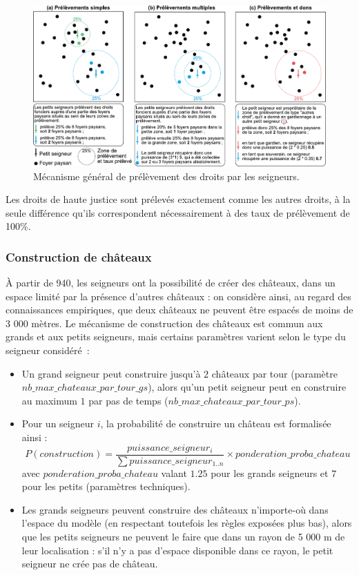 \begin{figure}[H]
	\centering
	\includegraphics[width=\linewidth]{img/prelevements_droits.pdf}
	\caption{Mécanisme général de prélèvement des droits par les seigneurs.}
	\label{fig:prelevement-droits}
\end{figure}

Les droits de haute justice sont prélevés exactement comme les autres droits, à la seule différence qu'ils correspondent nécessairement à des taux de prélèvement de 100\%.

\subsubsection{Construction de châteaux \label{sssec:constru-chateaux}}


À partir de 940, les seigneurs ont la possibilité de créer des châteaux, dans un espace limité par la présence d'autres châteaux : on considère ainsi, au regard des connaissances empiriques, que deux châteaux ne peuvent être espacés de moins de 3 000 mètres.
Le mécanisme de construction des châteaux est commun aux grands et aux petits seigneurs, mais certains paramètres varient selon le type du seigneur considéré :
\begin{itemize}
	\item Un grand seigneur peut construire jusqu'à $2$ châteaux par tour (paramètre $nb\_max\_chateaux\_par\_tour\_gs$), alors qu'un petit seigneur peut en construire au maximum $1$ par pas de temps ($nb\_max\_chateaux\_par\_tour\_ps$).
	\item Pour un seigneur $i$, la probabilité de construire un château est formalisée ainsi :\\
	$$ P \left( construction \right) = \frac{puissance\_seigneur_{i}}{\sum{puissance\_seigneur_{1..n}}} \times ponderation\_proba\_chateau $$ avec $ponderation\_proba\_chateau$ valant $1.25$ pour les grands seigneurs et $7$ pour les petits (paramètres techniques).
	\item Les grands seigneurs peuvent construire des châteaux n'importe-où dans l'espace du modèle (en respectant toutefois les règles exposées plus bas), alors que les petits seigneurs ne peuvent le faire que dans un rayon de 5 000 m de leur localisation : s'il n'y a pas d'espace disponible dans ce rayon, le petit seigneur ne crée pas de château.
\end{itemize}

